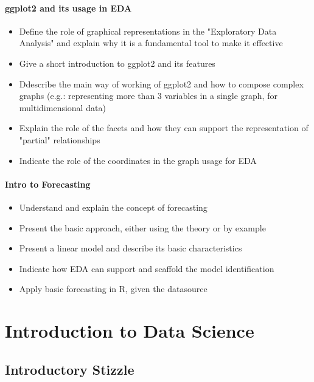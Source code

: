 \documentclass[a4paper]{article}
\begin{document}
		\paragraph{ggplot2 and its usage in EDA}
		
			\begin{itemize}
				\item Define the role of graphical representations in the "Exploratory Data Analysis" and explain why it is a fundamental tool to make it effective
				\item Give a short introduction to ggplot2 and its features
				\item Ddescribe the main way of working of ggplot2 and how to compose complex graphs (e.g.: representing more than 3 variables in a single graph, for multidimensional data)
				\item Explain the role of the facets and how they can support the representation of "partial" relationships
				\item Indicate the role of the coordinates in the graph usage for EDA
			\end{itemize}
		
		\paragraph{Intro to Forecasting}
		
			\begin{itemize}
				\item Understand and explain the concept of forecasting
				\item Present the basic approach, either using the theory or by example
				\item Present a linear model and describe its basic characteristics
				\item Indicate how EDA can support and scaffold the model identification
				\item Apply basic forecasting in R, given the datasource
			\end{itemize}
		
	\newpage
	
	\section{Introduction to Data Science}
	
		\subsection{Introductory Stizzle}
		
\end{document}
